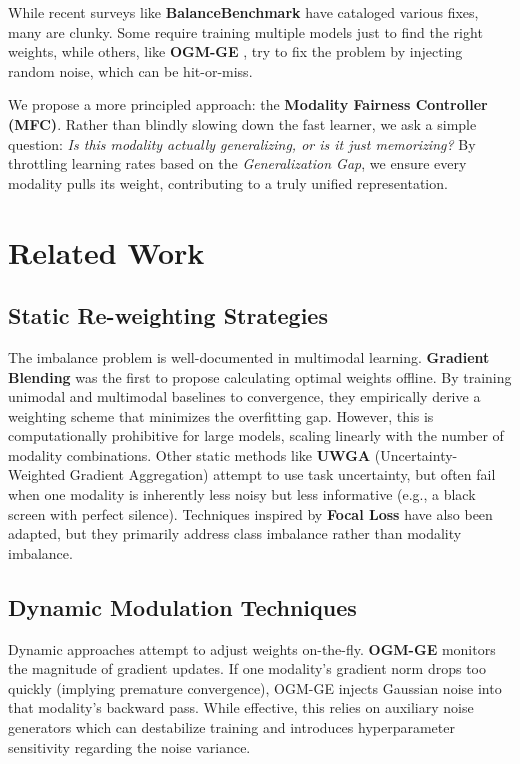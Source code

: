 \documentclass[10pt, twocolumn, letterpaper]{article}
\begin{document}
While recent surveys like \textbf{BalanceBenchmark} \cite{balancebenchmark} have cataloged various fixes, many are clunky. Some require training multiple models just to find the right weights, while others, like \textbf{OGM-GE} \cite{ogm_ge}, try to fix the problem by injecting random noise, which can be hit-or-miss.

We propose a more principled approach: the \textbf{Modality Fairness Controller (MFC)}. Rather than blindly slowing down the fast learner, we ask a simple question: \textit{Is this modality actually generalizing, or is it just memorizing?} By throttling learning rates based on the \textit{Generalization Gap}, we ensure every modality pulls its weight, contributing to a truly unified representation.


\section{Related Work}

\subsection{Static Re-weighting Strategies}
The imbalance problem is well-documented in multimodal learning. \textbf{Gradient Blending} \cite{gradient_blending} was the first to propose calculating optimal weights offline. By training unimodal and multimodal baselines to convergence, they empirically derive a weighting scheme that minimizes the overfitting gap. However, this is computationally prohibitive for large models, scaling linearly with the number of modality combinations. Other static methods like \textbf{UWGA} (Uncertainty-Weighted Gradient Aggregation) \cite{kendall_uncertainty} attempt to use task uncertainty, but often fail when one modality is inherently less noisy but less informative (e.g., a black screen with perfect silence). Techniques inspired by \textbf{Focal Loss} \cite{focalloss} have also been adapted, but they primarily address class imbalance rather than modality imbalance.

\subsection{Dynamic Modulation Techniques}
Dynamic approaches attempt to adjust weights on-the-fly. \textbf{OGM-GE} \cite{ogm_ge} monitors the magnitude of gradient updates. If one modality's gradient norm drops too quickly (implying premature convergence), OGM-GE injects Gaussian noise into that modality's backward pass. While effective, this relies on auxiliary noise generators which can destabilize training and introduces hyperparameter sensitivity regarding the noise variance.
\end{document}
